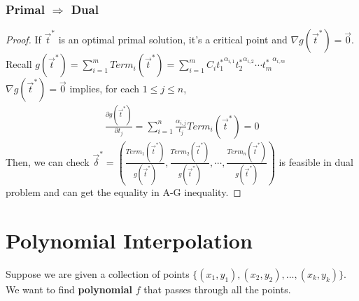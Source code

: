 \documentclass[11pt,a4paper]{article}
\newtheorem{theorem}{Theorem}
\begin{document}
\subsubsection*{Primal $\Rightarrow$ Dual}
\begin{center}
\end{center}
\begin{proof}
    If $\vec{t}^*$ is an optimal primal solution, it's a critical point and $\nabla g(\vec{t}^*)=\vec{0}$. Recall $g(\vec{t}^*)=\sum_{i=1}^m{Term}_i(\vec{t}^*)=\sum_{i=1}^mC_i{t_1^*}^{\alpha_{i,1}}{t_2^*}^{\alpha_{i,2}}\cdots {t_m^*}^{\alpha_{i,m}}$\\
    $\nabla g(\vec{t}^*)=\vec{0}$ implies, for each $1\leq j\leq n$,
    \begin{equation}
        \begin{aligned}
            \frac{\partial g(\vec{t}^*)}{\partial t_j}=\sum_{i=1}^n\frac{\alpha_{i,j}}{t_j}{Term}_i(\vec{t}^*)=0
        \end{aligned}
        \nonumber
    \end{equation}
    Then, we can check $\vec{\delta}^*=\left(\frac{{Term}_1(\vec{t}^*)}{g(\vec{t}^*)},\frac{{Term}_2(\vec{t}^*)}{g(\vec{t}^*)},\cdots,\frac{{Term}_n(\vec{t}^*)}{g(\vec{t}^*)}\right)$ is feasible in dual problem and can get the equality in A-G inequality.
\end{proof}






\section{Polynomial Interpolation}
Suppose we are given a collection of points $\{(x_1,y_1),(x_2,y_2),...,(x_k,y_k)\}$. We want to find \textbf{polynomial} $f$ that passes through all the points.
\end{document}
